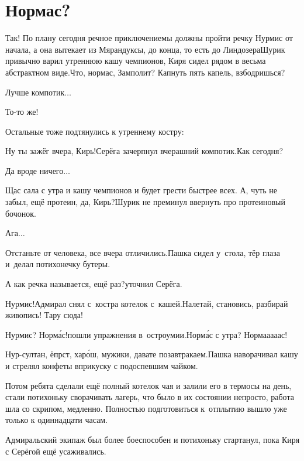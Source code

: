 \chapter{Нормас?}
\vepsianrose

\diagdash Так! По плану сегодня речное приключение\mdash мы должны пройти речку Нурмис от начала, а она вытекает из Мярандуксы, до конца, то есть до Линдозера\mdash Шурик привычно варил утреннюю кашу чемпионов, Киря сидел рядом в весьма абстрактном виде.\mdash Что, нормас, Замполит? Капнуть пять капель, взбодришься?

\diagdash Лучше компотик$\ldots$

\diagdash То-то же!

Остальные тоже подтянулись к утреннему костру:

\diagdash Ну ты зажёг вчера, Кирь!\mdash Серёга зачерпнул вчерашний компотик.\mdash Как сегодня?

\diagdash Да вроде ничего$\ldots$

\diagdash Щас сала с утра и кашу чемпионов и будет грести быстрее всех. А, чуть не забыл, ещё протеин, да, Кирь?\mdash Шурик не преминул ввернуть про протеиновый бочонок.

\diagdash Ага$\ldots$

\diagdash Отстаньте от человека, все вчера отличились.\mdash Пашка сидел у~стола, тёр глаза и~делал потихонечку бутеры.

\diagdash А как речка называется, ещё раз?\mdash уточнил Серёга.

\diagdash Нурмис!\mdash Адмирал снял с~костра котелок с~кашей.\mdash Налетай, становись, разбирай живопись! Тару сюда!

\diagdash Нурмис? Норм{\'а}с!\mdash пошли упражнения в~остроумии.\mdash Норм{\'а}с с утра?  Норма\sdash а\sdash а\sdash а\sdash ас!

\diagdash Нур-султан, ёпрст, хар{\'о}ш, мужики, давате позавтракаем.\mdash Пашка наворачивал кашу и стрелял конфеты вприкуску с подоспевшим чайком.

Потом ребята сделали ещё полный котелок чая и залили его в термосы на день, стали потихоньку сворачивать лагерь, что было в их состоянии непросто, работа шла со скрипом, медленно. Полностью подготовиться к~отплытию вышло уже только к одиннадцати часам.

Адмиральский экипаж был более боеспособен и потихоньку стартанул, пока Киря с Серёгой ещё усаживались. 


